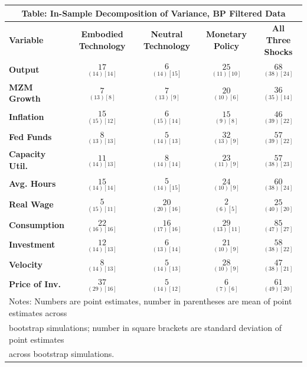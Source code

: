 \documentclass{article}
\begin{document}
 \begin{tabular}{|l|c|@{}c|c|@{}c|} 
 \hline 
 \multicolumn{5}{|c|}{\textbf{Table: In-Sample Decomposition of Variance, BP Filtered Data}} \\ \hline 
 \textbf{Variable} & \textbf{Embodied Technology} & \textbf{Neutral Technology} & \textbf{%
 Monetary Policy} & \textbf{All Three Shocks} \\ \hline\hline 
 \textbf{Output} & $\underset{( 14)[ 14]}{ 17}$ & $\underset{( 14)[ 15]}{  6}$ & $\underset{( 11)[ 10]}{ 25}$ & $\underset{( 38)[ 24]}{ 68}$ \\ \hline 
 \textbf{MZM Growth} & $\underset{( 13)[  8]}{  7}$ & $\underset{( 13)[  9]}{  7}$ & $\underset{( 10)[  6]}{ 20}$ & $\underset{( 35)[ 14]}{ 36}$ \\ \hline 
 \textbf{Inflation} & $\underset{( 15)[ 12]}{ 15}$ & $\underset{( 15)[ 14]}{  6}$ & $\underset{(  9)[  8]}{ 15}$ & $\underset{( 39)[ 22]}{ 46}$ \\ \hline 
 \textbf{Fed Funds} & $\underset{( 13)[ 13]}{  8}$ & $\underset{( 14)[ 13]}{  5}$ & $\underset{( 13)[  9]}{ 32}$ & $\underset{( 39)[ 22]}{ 57}$ \\ \hline 
 \textbf{Capacity Util.} & $\underset{( 14)[ 13]}{ 11}$ & $\underset{( 14)[ 14]}{  8}$ & $\underset{( 11)[  9]}{ 23}$ & $\underset{( 38)[ 23]}{ 57}$ \\ \hline 
 \textbf{Avg. Hours} & $\underset{( 14)[ 14]}{ 15}$ & $\underset{( 14)[ 15]}{  5}$ & $\underset{( 10)[  9]}{ 24}$ & $\underset{( 38)[ 24]}{ 60}$ \\ \hline 
 \textbf{Real Wage} & $\underset{( 15)[ 11]}{  5}$ & $\underset{( 20)[ 16]}{ 20}$ & $\underset{(  6)[  5]}{  2}$ & $\underset{( 40)[ 20]}{ 25}$ \\ \hline 
 \textbf{Consumption} & $\underset{( 16)[ 16]}{ 22}$ & $\underset{( 17)[ 16]}{ 16}$ & $\underset{( 13)[ 11]}{ 29}$ & $\underset{( 47)[ 27]}{ 85}$ \\ \hline 
 \textbf{Investment} & $\underset{( 14)[ 13]}{ 12}$ & $\underset{( 13)[ 14]}{  6}$ & $\underset{( 10)[  9]}{ 21}$ & $\underset{( 38)[ 22]}{ 58}$ \\ \hline 
 \textbf{Velocity} & $\underset{( 14)[ 13]}{  8}$ & $\underset{( 14)[ 13]}{  5}$ & $\underset{( 10)[  9]}{ 28}$ & $\underset{( 38)[ 21]}{ 47}$ \\ \hline 
 \textbf{Price of Inv.} & $\underset{( 29)[ 16]}{ 37}$ & $\underset{( 14)[ 12]}{  5}  $ & $\underset{(  7)[  6]}{  6}$ & $\underset{( 49)[ 20]}{ 61}$ \\ \hline 
 \multicolumn{5}{|l|}{Notes: Numbers are point estimates, number in 
 parentheses are mean of point estimates across} \\ \hline 
 \multicolumn{5}{|l|}{bootstrap simulations; number in square brackets are 
 standard deviation of point estimates} \\ \hline 
 \multicolumn{5}{|l|}{across bootstrap simulations.} \\ \hline 
 \end{tabular} 
\end{document}
